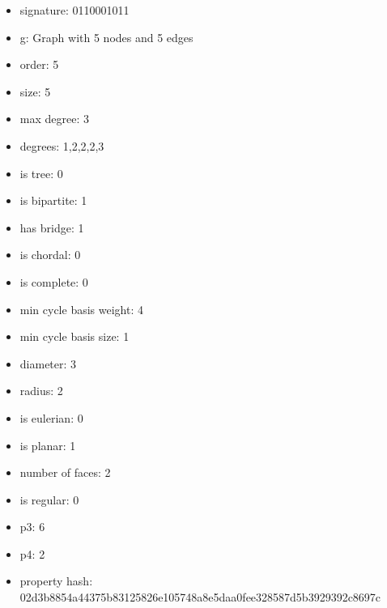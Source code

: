 \begin{itemize}
\item signature: 0110001011
\item g: Graph with 5 nodes and 5 edges
\item order: 5
\item size: 5
\item max degree: 3
\item degrees: 1,2,2,2,3
\item is tree: 0
\item is bipartite: 1
\item has bridge: 1
\item is chordal: 0
\item is complete: 0
\item min cycle basis weight: 4
\item min cycle basis size: 1
\item diameter: 3
\item radius: 2
\item is eulerian: 0
\item is planar: 1
\item number of faces: 2
\item is regular: 0
\item p3: 6
\item p4: 2
\item property hash: 02d3b8854a44375b83125826e105748a8e5daa0fee328587d5b3929392c8697c
\end{itemize}
\newpage
\begin{figure}
\end{figure}
